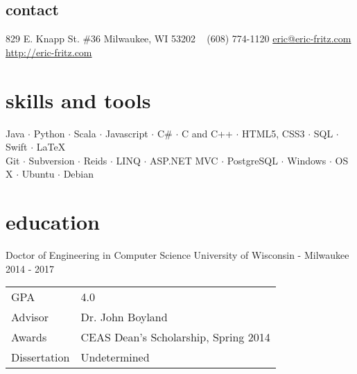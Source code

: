 \documentclass[]{fritz-resume}
\begin{document}


\begin{aside}
  \section{contact}
    829 E. Knapp St. \#36
    Milwaukee, WI 53202
    ~
    (608) 774-1120
    \href{mailto:eric@eric-fritz.com?subject=Resume}{eric@eric-fritz.com}
    \href{http://eric-fritz.com}{http://eric-fritz.com}
\end{aside}


\section{skills and tools}

\begin{centering}
{ \small
  Java $\cdot$
  Python $\cdot$
  Scala $\cdot$
  Javascript $\cdot$
  C\# $\cdot$
  C and C++ $\cdot$
  HTML5, CSS3 $\cdot$
  SQL $\cdot$
  Swift $\cdot$
  \LaTeX{} \\
  Git $\cdot$
  Subversion $\cdot$
  Reids $\cdot$
  LINQ $\cdot$
  ASP.NET MVC $\cdot$
  PostgreSQL $\cdot$
  Windows $\cdot$
  OS X $\cdot$
  Ubuntu $\cdot$
  Debian
}

\end{centering}


\section{education}

\entry
  {Doctor of Engineering in Computer Science}
  {University of Wisconsin - Milwaukee}
  {2014 - 2017}
  {
    \begin{tabular}{>{\raggedleft}p{1.7cm} l}
      GPA          & 4.0 \\
      Advisor      & Dr. John Boyland \\
      Awards       & CEAS Dean's Scholarship, Spring 2014 \\
      Dissertation & Undetermined
    \end{tabular}
  }
\end{document}
